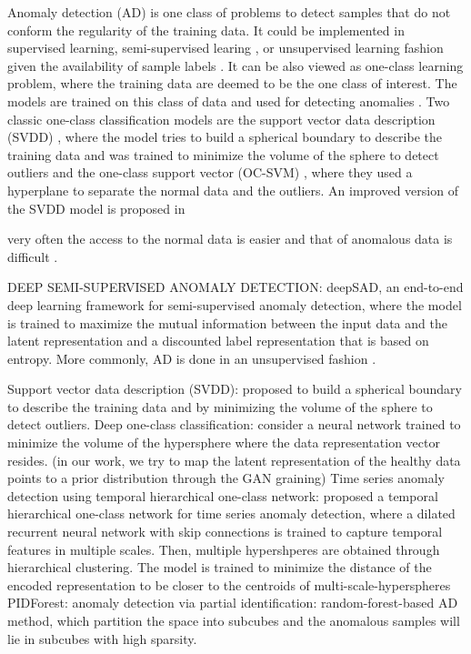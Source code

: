 \documentclass[pmlr]{jmlr}%
\begin{document}
Anomaly detection (AD) is one class of problems to detect samples that do not conform the regularity of the training data. It could be implemented in supervised learning, semi-supervised learing \cite{ruff2019deep}, or unsupervised learning fashion \cite{} given the availability of sample labels \cite{NEURIPS2019_805163a0}. It can be also viewed as one-class learning problem, where the training data are deemed to be the one class of interest. The models are trained on this class of data and used for detecting anomalies \cite{shen2020timeseries,ruff2019self,ruff2018deep, scholkopf2001estimating, tax2004support}. Two classic one-class classification models are the support vector data description (SVDD) \cite{tax2004support}, where the model tries to build a spherical boundary to describe the training data and was trained to minimize the volume of the sphere to detect outliers and the one-class support vector (OC-SVM) \cite{scholkopf2001estimating}, where they used a hyperplane to separate the normal data and the outliers. An improved version of the SVDD model is proposed in

very often the access to the normal data is easier and that of anomalous data is difficult . 



\cite{ruff2019deep} DEEP SEMI-SUPERVISED ANOMALY DETECTION: deepSAD, an end-to-end deep learning framework for semi-supervised anomaly detection, where the model is trained to maximize the mutual information between the input data and the latent representation and a discounted label representation that is based on entropy. 
More commonly, AD is done in an unsupervised fashion \cite{references}.

\cite{tax2004support} Support vector data description (SVDD): proposed to build a spherical boundary to describe the training data and by minimizing the volume of the sphere to detect outliers.
\cite{ruff2018deep}%
Deep one-class classification: consider a neural network trained to minimize the volume of the hypersphere where the data representation vector resides. (in our work, we try to map the latent representation of the healthy data points to a prior distribution through the GAN graining)
\cite{shen2020timeseries} Time series anomaly detection using temporal hierarchical one-class network: proposed a temporal hierarchical one-class network for time series anomaly detection, where a dilated recurrent neural network with skip connections is trained to capture temporal features in multiple scales. Then, multiple hypershperes are obtained through hierarchical clustering. The model is trained to minimize the distance of the encoded representation to be closer to the centroids of multi-scale-hyperspheres
\cite{gopalan2019pidforest} PIDForest: anomaly detection via partial identification: random-forest-based AD method, which partition the space into subcubes and the anomalous samples will lie in subcubes with high sparsity.
\end{document}
